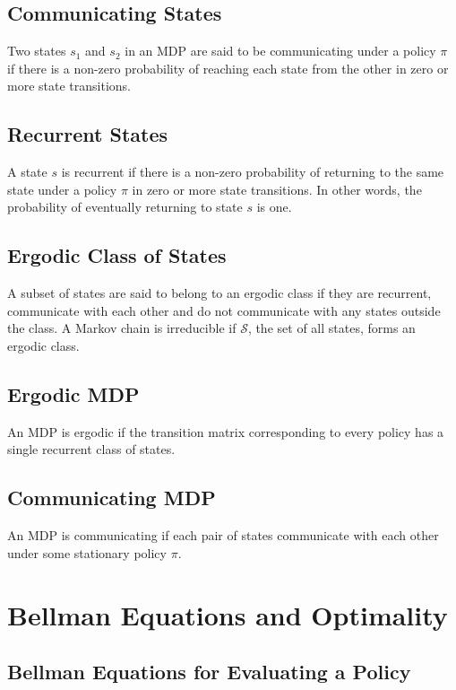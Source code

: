 \subsection{Communicating States}

Two states $s_1$ and $s_2$ in an MDP are said to be communicating under a policy $\pi$ if there is a non-zero probability of reaching each state from the other in zero or more state transitions.

\subsection{Recurrent States}

A state $s$ is recurrent if there is a non-zero probability of returning to the same state under a policy $\pi$ in zero or more state transitions.
In other words, the probability of eventually returning to state $s$ is one.

\subsection{Ergodic Class of States}

A subset of states are said to belong to an ergodic class if they are recurrent, communicate with each other and do not communicate with any states outside the class.
A Markov chain is irreducible if $\mathcal{S}$, the set of all states, forms an ergodic class.

\subsection{Ergodic MDP}

An MDP is ergodic if the transition matrix corresponding to every policy has a single recurrent class of states.

\subsection{Communicating MDP}

An MDP is communicating if each pair of states communicate with each other under some stationary policy $\pi$.

\section{Bellman Equations and Optimality}

\subsection{Bellman Equations for Evaluating a Policy}

